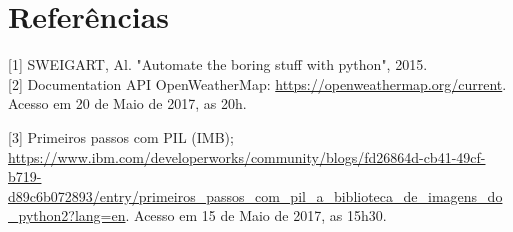 \documentclass[12pt, a4paper, twocolumn]{article}
\begin{document}
\section{Referências}
[1] SWEIGART, Al. "Automate the boring stuff with python", 2015. \\

[2] Documentation API OpenWeatherMap: \url{https://openweathermap.org/current}. Acesso em 20 de Maio de 2017, as 20h.

[3] Primeiros passos com PIL (IMB); \url{https://www.ibm.com/developerworks/community/blogs/fd26864d-cb41-49cf-b719-d89c6b072893/entry/primeiros_passos_com_pil_a_biblioteca_de_imagens_do_python2?lang=en}. Acesso em 15 de Maio de 2017, as 15h30.
\end{document}
